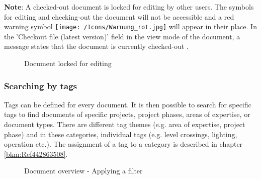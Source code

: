 
\textbf{Note}: A checked-out document is locked for editing by other users. The symbols for editing and checking-out the document will not be accessible and a red warning symbol \texttt{[image: /Icons/Warnung\_rot.jpg]}  will appear in their place. In the 'Checkout file (latest version)' field in the view mode of the document, a message states that the document is currently checked-out .

\begin{figure}[H]
\caption{Document locked for editing}
\end{figure}

\subsubsection{Searching by tags}
\label{bkm:Ref442275849}

Tags can be defined for every document. It is then possible to search for specific tags to find documents of specific projects, project phases, areas of expertise, or document types. There are different tag themes (e.g. area of expertise, project phase) and in these categories, individual tags (e.g. level crossings, lighting, operation etc.). The assignment of a tag to a category is described in chapter \ref{bkm:Ref442863508}.

\begin{figure}[H]
\caption{Document overview - Applying a filter}
\end{figure}

